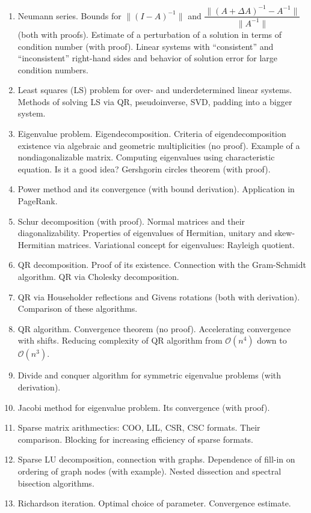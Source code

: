 \documentclass{article}
\begin{document}
\begin{enumerate}
	\item Neumann series.  Bounds for $\|(I-A)^{-1}\|$ and $\dfrac{\|(A+\Delta A)^{-1} - A^{-1}\|}{\|A^{-1}\|}$ (both with proofs). Estimate of a perturbation of a solution in terms of condition number (with proof). Linear systems with ``consistent'' and ``inconsistent'' right-hand sides and behavior of solution error for large condition numbers.
	\item Least squares (LS) problem for over- and underdetermined linear systems. Methods of solving LS via QR, pseudoinverse, SVD, padding into a bigger system.
	\item Eigenvalue problem. Eigendecomposition. Criteria of eigendecomposition existence via algebraic and geometric multiplicities (no proof). Example of a nondiagonalizable matrix. Computing eigenvalues using characteristic equation. Is it a good idea? Gershgorin circles theorem (with proof).
	\item Power method and its convergence (with bound derivation). Application in PageRank.
	\item Schur decomposition (with proof). Normal matrices and their diagonalizability. Properties of eigenvalues of Hermitian, unitary and skew-Hermitian matrices. Variational concept for eigenvalues: Rayleigh quotient.
	\item QR decomposition. Proof of its existence. Connection with the Gram-Schmidt algorithm. QR via Cholesky decomposition. 
	\item  QR via Householder reflections and Givens rotations (both with derivation). Comparison of these algorithms.
	\item QR algorithm. Convergence theorem (no proof). Accelerating convergence with shifts. Reducing complexity of QR algorithm from $\mathcal{O}(n^4)$ down to $\mathcal{O}(n^3)$.
	\item Divide and conquer algorithm for symmetric eigenvalue problems (with derivation).
	\item Jacobi method for eigenvalue problem. Its convergence (with proof). 
	\item Sparse matrix arithmectics: {COO, LIL, CSR, CSC} formats. Their comparison. Blocking for increasing efficiency of sparse formats.
	\item Sparse LU decomposition, connection with graphs. Dependence of fill-in on ordering of graph nodes (with example). Nested dissection and spectral bisection algorithms. 
	\item Richardson iteration. Optimal choice of parameter. Convergence estimate.

\end{enumerate}
\end{document}
